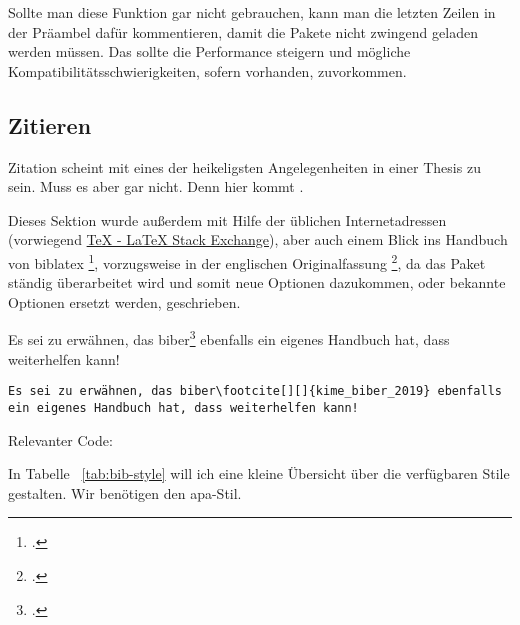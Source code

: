 Sollte man diese Funktion gar nicht gebrauchen, kann man die letzten Zeilen in der Präambel dafür kommentieren, damit die Pakete nicht zwingend geladen werden müssen. Das sollte die Performance steigern und mögliche Kompatibilitätsschwierigkeiten, sofern vorhanden, zuvorkommen.
\subsection{Zitieren}%
Zitation scheint mit eines der heikeligsten Angelegenheiten in einer Thesis zu sein. Muss es aber gar nicht. Denn hier kommt .

Dieses Sektion wurde außerdem mit Hilfe der üblichen Internetadressen (vorwiegend \href{https://tex.stackexchange.com/}{TeX - LaTeX Stack Exchange}), aber auch einem Blick ins Handbuch von biblatex \footcite{lehman_biblatex_2017}, vorzugsweise in der englischen Originalfassung \footcite{kime_biblatex_2019}, da das Paket ständig überarbeitet wird und somit neue Optionen dazukommen, oder bekannte Optionen ersetzt werden, geschrieben.

Es sei zu erwähnen, das biber\footcite[][]{kime_biber_2019} ebenfalls ein eigenes Handbuch hat, dass weiterhelfen kann!

\begin{lstlisting}[float=htpb,caption=Das Setzen von Zitations \protect\LaTeX{},label=lst:cites]
Es sei zu erwähnen, das biber\footcite[][]{kime_biber_2019} ebenfalls ein eigenes Handbuch hat, dass weiterhelfen kann!
\end{lstlisting}
Relevanter Code:


In Tabelle ~\ref{tab:bib-style} will ich eine kleine Übersicht über die verfügbaren Stile gestalten. Wir benötigen den \gls{apa}-Stil.

